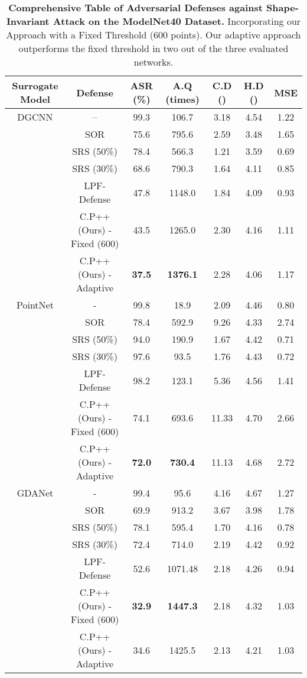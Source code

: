 \documentclass[10pt,twocolumn,letterpaper]{article}
\begin{document}
\begin{table*}
\begin{center}
\begin{tabular}{c || c || c c c c c}
\hline
Surrogate Model & Defense & ASR (\%) & A.Q (times) & C.D () & H.D () & MSE \\
\hline\hline
DGCNN \cite{dgcnn} & -- & 99.3 & 106.7 & 3.18 & 4.54 & 1.22\\
& SOR \cite{sor} & 75.6 & 795.6 & 2.59 & 3.48 & 1.65\\
& SRS (50\%) & 78.4 & 566.3 & 1.21 & 3.59 & 0.69\\
& SRS (30\%) & 68.6 & 790.3 & 1.64 & 4.11 & 0.85\\
& LPF-Defense\cite{lpf_defense} & 47.8 & 1148.0 & 1.84 & 4.09 & 0.93\\
& C.P++ (Ours) - Fixed (600) & 43.5 & 1265.0 & 2.30 & 4.16 & 1.11\\
& C.P++ (Ours) - Adaptive& \textbf{37.5} & \textbf{1376.1} & 2.28 & 4.06 & 1.17\\
\hline
PointNet \cite{pointnet} & - & 99.8 & 18.9 & 2.09 & 4.46 & 0.80\\
& SOR \cite{sor} & 78.4 & 592.9 & 9.26 & 4.33 & 2.74\\
& SRS (50\%) & 94.0 & 190.9 & 1.67 & 4.42 & 0.71\\
& SRS (30\%) & 97.6 & 93.5 & 1.76 & 4.43 & 0.72\\
& LPF-Defense\cite{lpf_defense} & 98.2 & 123.1 & 5.36 & 4.56 & 1.41\\
& C.P++ (Ours) - Fixed (600) & 74.1 & 693.6 & 11.33 & 4.70 & 2.66\\
& C.P++ (Ours) - Adaptive & \textbf{72.0} & \textbf{730.4} & 11.13 & 4.68 & 2.72\\
\hline
GDANet \cite{gdanet} & - & 99.4 & 95.6 & 4.16 & 4.67 & 1.27 \\
& SOR \cite{sor} & 69.9 & 913.2 & 3.67 & 3.98 & 1.78\\
& SRS (50\%) & 78.1 & 595.4 & 1.70 & 4.16 & 0.78\\
& SRS (30\%) & 72.4 & 714.0 & 2.19 & 4.42 & 0.92\\
& LPF-Defense\cite{lpf_defense} & 52.6 & 1071.48 & 2.18 & 4.26 & 0.94\\
& C.P++ (Ours) - Fixed (600) & \textbf{32.9} & \textbf{1447.3} & 2.18 & 4.32 & 1.03\\
& C.P++ (Ours) - Adaptive & 34.6 & 1425.5 & 2.13 & 4.21 & 1.03\\
\hline
\end{tabular}
\end{center}
\caption{\textbf{Comprehensive Table of Adversarial Defenses against Shape-Invariant Attack\cite{shape_invariant} on the ModelNet40\cite{modelnet40} Dataset.} Incorporating our Approach with a Fixed Threshold (600 points). Our adaptive approach outperforms the fixed threshold in two out of the three evaluated networks.}
\label{table:adversarial_attack_supp}
\end{table*}
\end{document}
